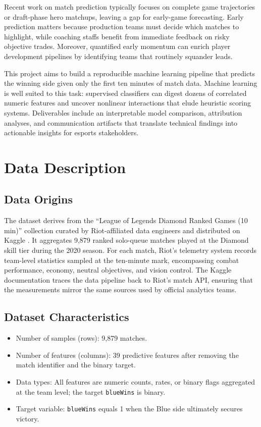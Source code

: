 \documentclass[aps,prl,preprint,groupedaddress]{revtex4-2}
\begin{document}
Recent work on match prediction typically focuses on complete game trajectories or draft-phase hero matchups, leaving a gap for early-game forecasting. Early prediction matters because production teams must decide which matches to highlight, while coaching staffs benefit from immediate feedback on risky objective trades. Moreover, quantified early momentum can enrich player development pipelines by identifying teams that routinely squander leads.

This project aims to build a reproducible machine learning pipeline that predicts the winning side given only the first ten minutes of match data. Machine learning is well suited to this task: supervised classifiers can digest dozens of correlated numeric features and uncover nonlinear interactions that elude heuristic scoring systems. Deliverables include an interpretable model comparison, attribution analyses, and communication artifacts that translate technical findings into actionable insights for esports stakeholders.

\section{Data Description}
\label{sec:data}

\subsection{Data Origins}
The dataset derives from the ``League of Legends Diamond Ranked Games (10 min)'' collection curated by Riot-affiliated data engineers and distributed on Kaggle \cite{bobby2020lol}. It aggregates 9,879 ranked solo-queue matches played at the Diamond skill tier during the 2020 season. For each match, Riot's telemetry system records team-level statistics sampled at the ten-minute mark, encompassing combat performance, economy, neutral objectives, and vision control. The Kaggle documentation traces the data pipeline back to Riot's match API, ensuring that the measurements mirror the same sources used by official analytics teams.

\subsection{Dataset Characteristics}
\begin{itemize}
    \item Number of samples (rows): 9,879 matches.
    \item Number of features (columns): 39 predictive features after removing the match identifier and the binary target.
    \item Data types: All features are numeric counts, rates, or binary flags aggregated at the team level; the target \texttt{blueWins} is binary.
    \item Target variable: \texttt{blueWins} equals 1 when the Blue side ultimately secures victory.
\end{itemize}
\end{document}
